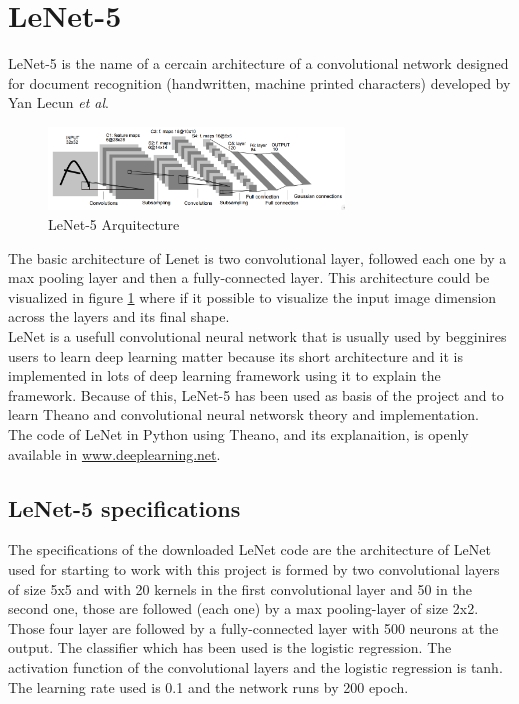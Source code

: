 \section{LeNet-5}
LeNet-5 \cite{Lenet5} is the name of a cercain architecture of a convolutional network designed for document recognition (handwritten, machine printed characters) developed by Yan Lecun \textit{et al}.\\

\begin{figure}[htb]
  \centering
  \includegraphics[width=0.7\textwidth]{images/images_lenet/LenetArquitectura.png}
  \caption{LeNet-5 Arquitecture}
  \label{Lenet5Arquitectura}
\end{figure}

The basic architecture of Lenet is two convolutional layer, followed each one by a max pooling layer and then a fully-connected layer. This architecture could be visualized in figure \ref{Lenet5Arquitectura} where if it possible to visualize the input image dimension across the layers and its final shape.\\

LeNet is a usefull convolutional neural network that is usually used by begginires users to learn deep learning matter because its short architecture and it is implemented in lots of deep learning framework using it to explain the framework. Because of this, LeNet-5 has been used as basis of the project and to learn Theano and convolutional neural networsk theory and implementation.\\

The code of LeNet in Python using Theano, and its explanaition, is openly available in \url{www.deeplearning.net}.\\

\subsection{LeNet-5 specifications}
The specifications of the downloaded LeNet code are the architecture of LeNet used for starting to work with this project is formed by two convolutional layers of size 5x5 and with 20 kernels in the first convolutional layer and 50 in the second one, those are followed (each one) by a max pooling-layer of size 2x2. Those four layer are followed by a fully-connected layer with 500 neurons at the output. The classifier which has been used is the logistic regression. The activation function of the convolutional layers and the logistic regression is tanh. The learning rate used is 0.1 and the network runs by 200 epoch.\\

